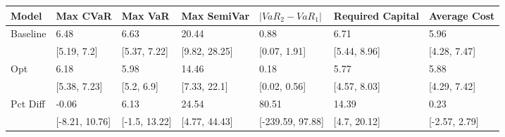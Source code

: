 \begin{tabular}{lllllll}
\toprule
   Model &       Max CVaR &       Max VaR &   Max SemiVar & $|VaR_2 - VaR_1|$ & Required Capital &  Average Cost \\
\midrule
Baseline &           6.48 &          6.63 &         20.44 &              0.88 &             6.71 &          5.96 \\
         &    [5.19, 7.2] &  [5.37, 7.22] & [9.82, 28.25] &      [0.07, 1.91] &     [5.44, 8.96] &  [4.28, 7.47] \\
     Opt &           6.18 &          5.98 &         14.46 &              0.18 &             5.77 &          5.88 \\
         &   [5.38, 7.23] &    [5.2, 6.9] &  [7.33, 22.1] &      [0.02, 0.56] &     [4.57, 8.03] &  [4.29, 7.42] \\
Pct Diff &          -0.06 &          6.13 &         24.54 &             80.51 &            14.39 &          0.23 \\
         & [-8.21, 10.76] & [-1.5, 13.22] & [4.77, 44.43] &  [-239.59, 97.88] &     [4.7, 20.12] & [-2.57, 2.79] \\
\bottomrule
\end{tabular}
